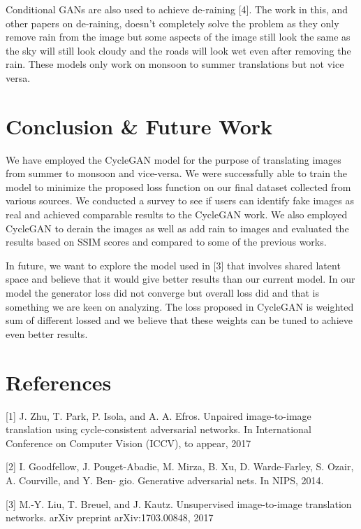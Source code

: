 \documentclass{article}
\begin{document}
Conditional GANs are also used to achieve de-raining [4]. The work in this, and other papers on de-raining, doesn’t completely solve the problem as they only remove rain from the image but some aspects of the image still look the same as the sky will still look cloudy and the roads will look wet even after removing the rain. These models only work on monsoon to summer translations but not vice versa.

\section{Conclusion \& Future Work}

We have employed the CycleGAN model for the purpose of translating images from summer to monsoon and vice-versa. We were successfully able to train the model to minimize the proposed loss function on our final dataset collected from various sources. We conducted a survey to see if users can identify fake images as real and achieved comparable results to the CycleGAN work. We also employed CycleGAN to derain the images as well as add rain to images and evaluated the results based on SSIM scores and compared to some of the previous works.

In future, we want to explore the model used in [3] that involves shared latent space and believe that it would give better results than our current model. In our model the generator loss did not converge but overall loss did and that is something we are keen on analyzing. The loss proposed in CycleGAN is weighted sum of different lossed and we believe that these weights can be tuned to achieve even better results.


\section*{References}

\small
\label{[1]}[1] J. Zhu, T. Park, P. Isola, and A. A. Efros. Unpaired image-to-image 
translation using cycle-consistent adversarial networks. 
In International Conference on Computer Vision (ICCV), to appear, 2017

\label{[2]}[2] I. Goodfellow, J. Pouget-Abadie, M. Mirza, B. Xu, D. Warde-Farley, 
S. Ozair, A. Courville, and Y. Ben- gio. Generative adversarial nets. 
In NIPS, 2014.

\label{[3]}[3] M.-Y. Liu, T. Breuel, and J. Kautz. Unsupervised 
image-to-image translation networks. arXiv preprint arXiv:1703.00848, 2017
\end{document}
